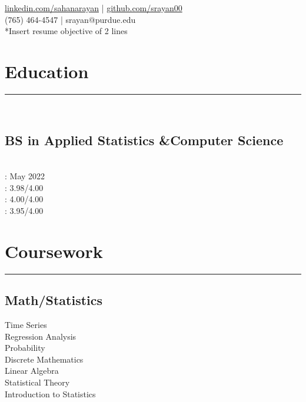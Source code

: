 \documentclass[]{sahana}
\begin{document}
{\href{https://www.linkedin.com/in/sahanarayan}{linkedin.com/sahanarayan} |
 \href{https://github.com/srayan00}{github.com/srayan00}\\
(765) 464-4547 | srayan@purdue.edu \\
*Insert resume objective of 2 lines\\}
%
%
\begin{minipage}[t]{0.33\textwidth}
\section{Education} 
\noindent\rule{5cm}{0.4pt}\\
\vspace{-8pt}
\subsection{BS in Applied Statistics \&\newline Computer Science}
\\
 : May 2022\\
 : 3.98/4.00\\
 : 4.00/4.00\\
 : 3.95/4.00
\vspace{-5pt}
\sectionsep

\section{Coursework}
\noindent\rule{5cm}{0.4pt}
\subsection{Math/Statistics}
Time Series\\
Regression Analysis\\
Probability\\
Discrete Mathematics\\
Linear Algebra\\
Statistical Theory\\
Introduction to Statistics
\vspace{6pt}

\end{minipage}
\end{document}
